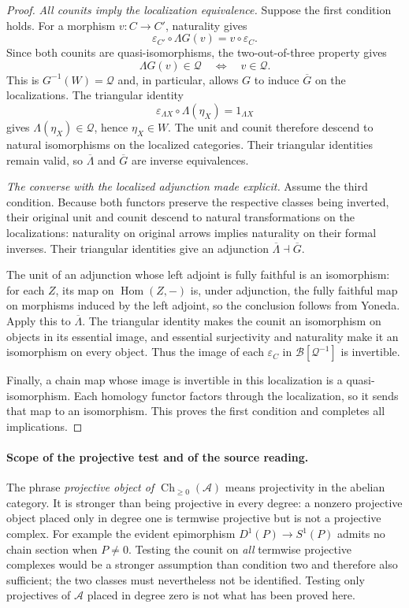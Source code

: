 \documentclass[11pt,a4paper]{article}
\theoremstyle{definition}\newtheorem{definition}[theorem]{Definition}
\theoremstyle{remark}\newtheorem{remark}[theorem]{Remark}
\begin{document}
\begin{proof}
\emph{All counits imply the localization equivalence.}
Suppose the first condition holds.  For a morphism $v:C\to C'$,
naturality gives
\[
 \varepsilon_{C'}\circ\Lambda G(v)=v\circ\varepsilon_C.
\]
Since both counits are quasi-isomorphisms, the two-out-of-three
property gives
\[
 \Lambda G(v)\in\mathcal Q
       \quad\Longleftrightarrow\quad v\in\mathcal Q.
\]
This is $G^{-1}(W)=\mathcal Q$ and, in particular, allows $G$ to
induce $\overline G$ on the localizations.  The triangular identity
\[
 \varepsilon_{\Lambda X}\circ\Lambda(\eta_X)
       =1_{\Lambda X}
\]
gives $\Lambda(\eta_X)\in\mathcal Q$, hence $\eta_X\in W$.
The unit and counit therefore descend to natural isomorphisms on the
localized categories.  Their triangular identities remain valid,
so $\overline\Lambda$ and $\overline G$ are inverse equivalences.

\emph{The converse with the localized adjunction made explicit.}
Assume the third condition.  Because both functors preserve the
respective classes being inverted, their original unit and counit
descend to natural transformations on the localizations: naturality
on original arrows implies naturality on their formal inverses.
Their triangular identities give an adjunction
$\overline\Lambda\dashv\overline G$.

The unit of an adjunction whose left adjoint is fully faithful is an
isomorphism: for each $Z$, its map on $\operatorname{Hom}(Z,-)$ is,
under adjunction, the fully faithful map on morphisms induced by the
left adjoint, so the conclusion follows from Yoneda.  Apply this to
$\overline\Lambda$.  The triangular identity makes the counit an
isomorphism on objects in its essential image, and essential
surjectivity and naturality make it an isomorphism on every object.
Thus the image of each $\varepsilon_C$ in
$\mathcal B[\mathcal Q^{-1}]$ is invertible.

Finally, a chain map whose image is invertible in this localization
is a quasi-isomorphism.  Each homology functor factors through the
localization, so it sends that map to an isomorphism.  This proves
the first condition and completes all implications.
\end{proof}

\paragraph{Scope of the projective test and of the source reading.}
The phrase \emph{projective object of
$\operatorname{Ch}_{\geq0}(\mathcal A)$} means projectivity in the
abelian category.  It is stronger than being projective in every
degree: a nonzero projective object placed only in degree one is
termwise projective but is not a projective complex.  For example the
evident epimorphism $D^1(P)\to S^1(P)$ admits no chain section when
$P\ne0$.  Testing the counit on \emph{all} termwise projective
complexes would be a stronger assumption than condition two and
therefore also sufficient; the two classes must nevertheless not be
identified.  Testing only projectives of $\mathcal A$ placed in
degree zero is not what has been proved here.
\end{document}
